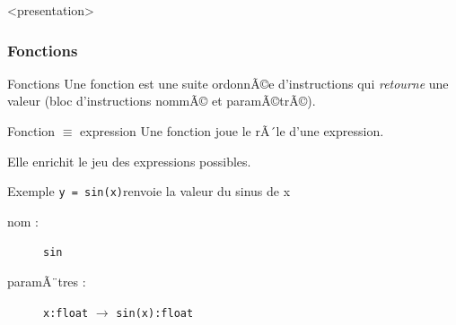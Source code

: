 \begin{frame}<presentation>
\frametitle{Fonctions}
\begin{block}{Fonctions}
Une fonction est une suite ordonnÃ©e d'instructions
qui {\em retourne} une valeur
(bloc d'instructions nommÃ© et paramÃ©trÃ©).
\end{block}
\pause
\begin{block}{Fonction $\equiv$ expression}
Une fonction joue le rÃ´le d'une expression.

\pause
Elle enrichit le jeu des expressions possibles.
\end{block}
\pause
\begin{block}{Exemple}
{\tt y = sin(x)}\hfill renvoie la valeur du sinus de x
\begin{description}
\item[nom :] {\tt sin}
\item[paramÃ¨tres :] {\tt x:float} $\rightarrow$ {\tt sin(x):float} 
\end{description}
\end{block}

\end{frame}
